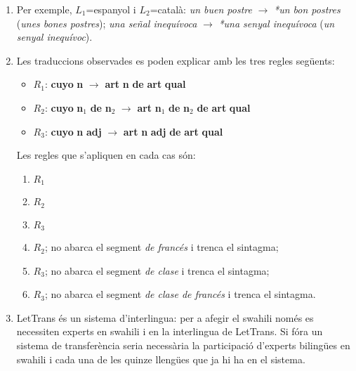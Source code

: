 \begin{enumerate}
  \item Per exemple, $L_1$=espanyol i $L_2$=català: \emph{un buen
      postre} $\rightarrow$ \emph{*un bon postres} (\emph{unes bones
      postres}); \emph{una señal inequívoca} $\rightarrow$ \emph{*una
        senyal inequívoca} (\emph{un senyal inequívoc}).


\item Les traduccions observades es poden explicar amb les tres regles
  següents:
\begin{itemize}
\item $R_1$: {\bf cuyo} {\bf n} $\rightarrow$ {\bf art} {\bf n} {\bf de}
{\bf art} {\bf qual}
\item $R_2$: {\bf cuyo} {\bf n}$_1$ {\bf de} {\bf n}$_2$ 
$\rightarrow$ {\bf art} {\bf n}$_1$ {\bf de} {\bf n}$_2$ {\bf de} 
{\bf art} {\bf qual}
\item $R_3$: {\bf cuyo} {\bf n} {\bf adj} $\rightarrow$ {\bf art} {\bf n} {\bf adj}  {\bf de}
{\bf art} {\bf qual}
\end{itemize}
Les regles que s'apliquen en cada cas són:
\begin{enumerate}
\item $R_1$
\item $R_2$
\item $R_3$
\item $R_2$; no abarca el segment  \emph{de francés} i trenca el
  sintagma; 
\item $R_3$; no abarca el segment  \emph{de clase} i trenca el
  sintagma;
\item $R_3$; no abarca el segment \emph{de clase de francés} i trenca
  el sintagma.
\end{enumerate}


\item LetTrans és un sistema d'interlingua: per a afegir el swahili
  només es necessiten experts en swahili i en la interlingua de
  LetTrans. Si fóra un sistema de transferència seria necessària la
  participació d'experts bilingües en swahili i cada una de les quinze
  llengües que ja hi ha en el sistema.


\end{enumerate}
